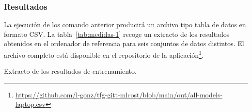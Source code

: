 \subsubsection{Resultados}

La ejecución de los comando anterior producirá un archivo tipo tabla de datos en formato CSV. La tabla~\ref{tab:medidas-1} recoge un extracto de los resultados obtenidos en el ordenador de referencia para seis conjuntos de datos distintos. El archivo completo está disponible en el repositorio de la aplicación\footnote{\url{https://github.com/l-gonz/tfg-gitt-mlcost/blob/main/out/all-models-laptop.csv}}.

\begin{table}[H]
\caption[Extracto de los resultados de entrenamiento]{Extracto de los resultados de entrenamiento.}


\end{table}
